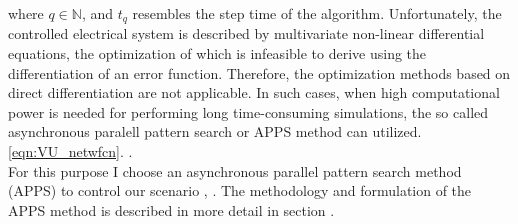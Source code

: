        where $q\in\mathbb{N}$, and $t_q$ resembles the step time of the algorithm.%
        Unfortunately, the controlled electrical system is described by multivariate non-linear differential equations, the optimization of which is infeasible to derive using the differentiation of an error function. Therefore, the optimization methods based on direct differentiation are not applicable. In such cases, when high computational power is needed for performing long time-consuming simulations, the so called asynchronous paralell pattern search or APPS method can utilized.\\
          \ref{eqn:VU_netwfcn}.  \cite{el2011active}.\\
        For this purpose I choose an asynchronous parallel pattern search method (APPS) to control our scenario \cite{hough2001asynchronous}, \cite{kolda2003understanding}. The methodology and formulation of the APPS method is described in more detail in section .

